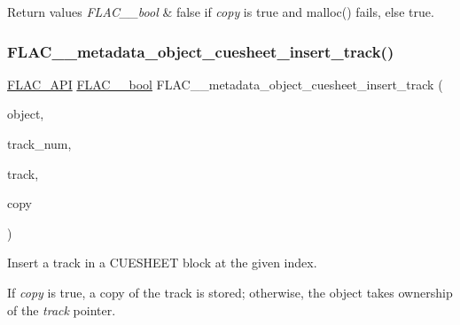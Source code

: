 \begin{DoxyRetVals}{Return values}
{\em F\+L\+A\+C\+\_\+\+\_\+bool} & {\ttfamily false} if {\itshape copy} is {\ttfamily true} and malloc() fails, else {\ttfamily true}. \\
\hline
\end{DoxyRetVals}
\mbox{\label{group__flac__metadata__object_ga5dbdffac2cd7e327f711103c15e015ac}} 
\subsubsection{\texorpdfstring{F\+L\+A\+C\+\_\+\+\_\+metadata\+\_\+object\+\_\+cuesheet\+\_\+insert\+\_\+track()}{FLAC\_\_metadata\_object\_cuesheet\_insert\_track()}}
{\footnotesize\ttfamily \hyperlink{group__flac__export_ga56ca07df8a23310707732b1c0007d6f5}{F\+L\+A\+C\+\_\+\+A\+PI} \hyperlink{ordinals_8h_a95103469f1cbd78b8cf250194985b34e}{F\+L\+A\+C\+\_\+\+\_\+bool} F\+L\+A\+C\+\_\+\+\_\+metadata\+\_\+object\+\_\+cuesheet\+\_\+insert\+\_\+track (\begin{DoxyParamCaption}\item[{\hyperlink{struct_f_l_a_c_____stream_metadata}{F\+L\+A\+C\+\_\+\+\_\+\+Stream\+Metadata} $\ast$}]{object,  }\item[{unsigned}]{track\+\_\+num,  }\item[{\hyperlink{struct_f_l_a_c_____stream_metadata___cue_sheet___track}{F\+L\+A\+C\+\_\+\+\_\+\+Stream\+Metadata\+\_\+\+Cue\+Sheet\+\_\+\+Track} $\ast$}]{track,  }\item[{\hyperlink{ordinals_8h_a95103469f1cbd78b8cf250194985b34e}{F\+L\+A\+C\+\_\+\+\_\+bool}}]{copy }\end{DoxyParamCaption})}

Insert a track in a C\+U\+E\+S\+H\+E\+ET block at the given index.

If {\itshape copy} is {\ttfamily true}, a copy of the track is stored; otherwise, the object takes ownership of the {\itshape track} pointer.


